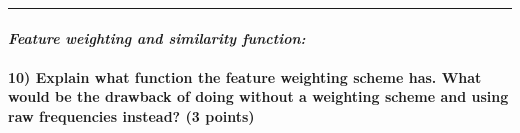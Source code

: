 \documentclass[11pt]{article}
\begin{document}
    \begin{center}\rule{0.5\linewidth}{\linethickness}\end{center}

\hypertarget{feature-weighting-and-similarity-function}{%
\paragraph{\texorpdfstring{\emph{Feature weighting and similarity
function:}}{Feature weighting and similarity function:}}\label{feature-weighting-and-similarity-function}}

    \hypertarget{explain-what-function-the-feature-weighting-scheme-has.-what-would-be-the-drawback-of-doing-without-a-weighting-scheme-and-using-raw-frequencies-instead-3-points}{%
\paragraph{10) Explain what function the feature weighting scheme has.
What would be the drawback of doing without a weighting scheme and using
raw frequencies instead? (3
points)}\label{explain-what-function-the-feature-weighting-scheme-has.-what-would-be-the-drawback-of-doing-without-a-weighting-scheme-and-using-raw-frequencies-instead-3-points}}
\end{document}
